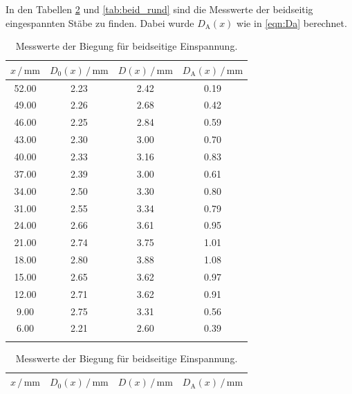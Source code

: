 In den Tabellen \ref{tab:beid_eckig} und \ref{tab:beid_rund} sind die Messwerte der beidseitig eingespannten Stäbe zu finden.
Dabei wurde $D_\text{A}(x)$ wie in \eqref{eqn:Da} berechnet.

\begin{table}
\centering
\caption{Messwerte der Biegung für beidseitige Einspannung.}
\begin{tabular}[t]{cccc}
    \toprule
    $x\,/\,\si{\milli\meter}$ & $D_0(x) \,/\, \si{\milli\meter}$ & $D(x) \,/\, \si{\milli\meter}$ & $D_\text{A}(x) \,/\, \si{\milli\meter}$\\
    \midrule
    52.00 & 2.23 & 2.42 & 0.19 \\
    49.00 & 2.26 & 2.68 & 0.42 \\
    46.00 & 2.25 & 2.84 & 0.59 \\
    43.00 & 2.30 & 3.00 & 0.70 \\
    40.00 & 2.33 & 3.16 & 0.83 \\
    37.00 & 2.39 & 3.00 & 0.61 \\
    34.00 & 2.50 & 3.30 & 0.80 \\
    31.00 & 2.55 & 3.34 & 0.79 \\
    24.00 & 2.66 & 3.61 & 0.95 \\
    21.00 & 2.74 & 3.75 & 1.01 \\
    18.00 & 2.80 & 3.88 & 1.08 \\
    15.00 & 2.65 & 3.62 & 0.97 \\
    12.00 & 2.71 & 3.62 & 0.91 \\
    9.00 & 2.75 & 3.31 & 0.56 \\
    6.00 & 2.21 & 2.60 & 0.39 \\
    \bottomrule
    
    \label{tab:beid_eckig}
\end{tabular}
\begin{tabular}[t]{cccc}
    \toprule
    $x\,/\,\si{\milli\meter}$ & $D_0(x) \,/\, \si{\milli\meter}$ & $D(x) \,/\, \si{\milli\meter}$ & $D_\text{A}(x) \,/\, \si{\milli\meter}$\\
    \midrule
    

\end{tabular}
\end{table}
